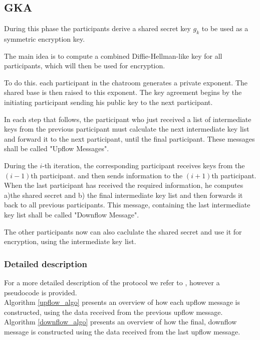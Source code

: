 \documentclass[12pt,titlepage,a4paper]{article}
\begin{document}
{\clearpage
\subsection{GKA}

During this phase the participants derive a shared secret key $g_k$ to be used
as a symmetric encryption key.

The main idea is to compute a combined Diffie-Hellman-like key for all
participants, which will then be used for encryption.

To do this. each participant in the chatroom generates a private exponent.
The shared base is then raised to this exponent. The key agreement begins
by the initiating participant sending his public key to the next participant.

In each step that follows, the participant who just received a list of intermediate
keys from the previous participant must calculate the next intermediate key list and
forward it to the next participant, until the final participant. These messages
shall be called "Upflow Messages".

During the $i$-th iteration, the corresponding participant receives keys from the
$(i - 1)$th participant. and then sends information to the $(i + 1)$th participant.
When the last participant has received the required information, he computes a)the
shared secret and b) the final intermediate key list and then forwards it back to
all previous participants. This message, containing the last intermediate key list
shall be called "Downflow Message".

The other participants now can also caclulate the shared secret and use it for
encryption, using the intermediate key list.

\subsubsection{Detailed description}
For a more detailed description of the protocol we refer to \cite{mpenc}, however
a pseudocode is provided.\\

Algorithm \ref{upflow_algo} presents an overview of how each upflow message is constructed, using the data received from the previous upflow message.\\

Algorithm \ref{downflow_algo} presents an overview of how the final, downflow message is constructed using the data received from the last upflow message.\\


}
\end{document}
